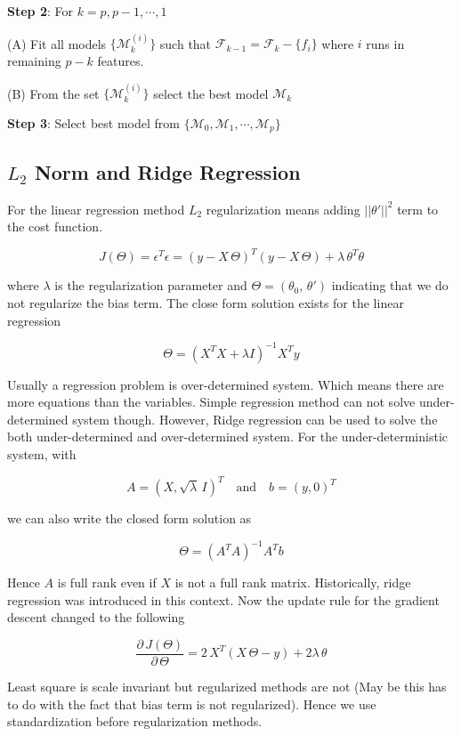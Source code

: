 \documentclass[11pt]{article}
\theoremstyle{definition}
\begin{document}
{\bf{Step 2}}: For $k = p, p-1, \cdots, 1$ 

\quad (A) Fit all models $\{ \mathcal{M}_k^{(i)} \}$  such that $\mathcal{F}_{k-1} = \mathcal{F}_k - \{f_i \}$ where $i$ runs in remaining $p-k$ features.

\quad (B) From the set $\{ \mathcal{M}_k^{(i)} \}$ select the best model $\mathcal{M}_k$

{\bf{Step 3}}: Select best model from $\{ \mathcal{M}_0, \mathcal{M}_1, \cdots, \mathcal{M}_p \}$


\subsection{$L_2$ Norm and Ridge Regression }



For the linear regression method $L_2$ regularization means adding $||\theta'||^2$ term to the cost function. 

$$
J(\Theta) = \epsilon^T \epsilon = (y - X\, \Theta)^T (y - X\, \Theta) + \lambda\, \theta^T\theta
$$

where $\lambda$ is the regularization parameter and  $\Theta = (\theta_0, \, \theta')$ indicating that we do not regularize the bias term. The close form solution exists for the linear regression 

$$
\Theta = (X^T X + \lambda I)^{-1} X^T y
$$

Usually a regression problem is over-determined system. Which means there are more equations than the variables. Simple regression method can not solve under-determined system though. However, Ridge regression can be used to solve the both under-determined and over-determined system. For the under-deterministic system, with  

$$A = (X, \sqrt{\lambda} \, I )^T \quad \text{and}\quad b = (y, 0)^T$$

we can also write the closed form solution as 

$$
\Theta = (A^T A)^{-1} A^T b 
$$

Hence $A$ is full rank even if $X$ is not a full rank matrix. Historically, ridge regression was introduced in this context. Now the update rule for the gradient descent changed to the following 

$$
\frac{\partial \, J(\Theta)}{\partial\, \Theta} = 2\, X^T (X\, \Theta - y) + 2 \lambda \, \theta
$$

Least square is scale invariant but regularized methods are not (May be this has to do with the fact that bias term is not regularized). Hence we use standardization before regularization methods. 
\end{document}
